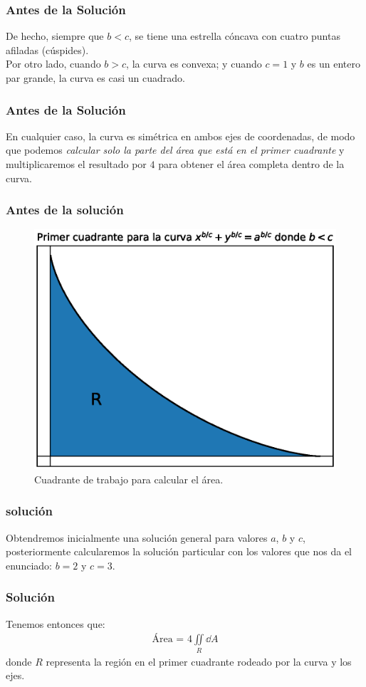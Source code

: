 \begin{frame}
\frametitle{Antes de la Solución}
De hecho, siempre que $b < c$, se tiene una estrella cóncava con cuatro puntas afiladas (cúspides).
\\
\bigskip
Por otro lado, cuando $b > c$, la curva es convexa; y cuando $c = 1$ y $b$ es un entero par grande, la curva es casi un cuadrado.
\end{frame}
\begin{frame}
\frametitle{Antes de la Solución}
En cualquier caso, la curva es simétrica en ambos ejes de coordenadas, de modo que podemos \emph{calcular solo la parte del área que está en el primer cuadrante} y multiplicaremos el resultado por $4$ para obtener el área completa dentro de la curva.
\end{frame}
\begin{frame}
\frametitle{Antes de la solución}
\begin{figure}[H]
    \centering
    \includegraphics[scale=0.5]{Imagenes/plot_curva_estrella_02.eps}
    \caption{Cuadrante de trabajo para calcular el área.}
    \label{fig:figura_curva_estrella_cuadrante}
\end{figure}
\end{frame}
\begin{frame}
\frametitle{solución}
Obtendremos inicialmente una solución general para valores $a$, $b$ y $c$, posteriormente calcularemos la solución particular con los valores que nos da el enunciado: $b = 2$ y $c = 3$.
\end{frame}
\begin{frame}
\frametitle{Solución}
Tenemos entonces que:
\begin{align*}
\mbox{Área = } 4 \iint \limits_{R} \dd{A}
\end{align*}
donde $R$ representa la región en el primer cuadrante rodeado por la curva y los ejes.
\end{frame}
